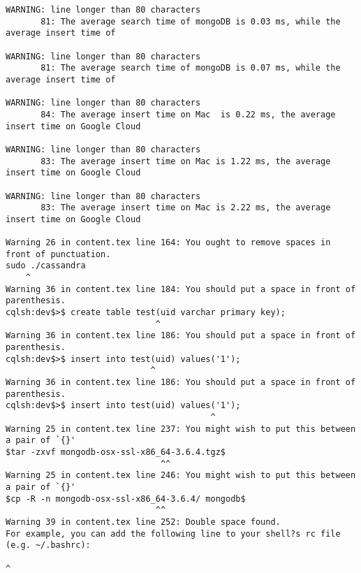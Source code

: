 \begin{tiny}
\begin{verbatim}
WARNING: line longer than 80 characters
       81: The average search time of mongoDB is 0.03 ms, while the average insert time of 

WARNING: line longer than 80 characters
       81: The average search time of mongoDB is 0.07 ms, while the average insert time of 

WARNING: line longer than 80 characters
       84: The average insert time on Mac  is 0.22 ms, the average insert time on Google Cloud

WARNING: line longer than 80 characters
       83: The average insert time on Mac is 1.22 ms, the average insert time on Google Cloud

WARNING: line longer than 80 characters
       83: The average insert time on Mac is 2.22 ms, the average insert time on Google Cloud

Warning 26 in content.tex line 164: You ought to remove spaces in front of punctuation.
sudo ./cassandra  
    ^
Warning 36 in content.tex line 184: You should put a space in front of parenthesis.
cqlsh:dev$>$ create table test(uid varchar primary key);   
                              ^
Warning 36 in content.tex line 186: You should put a space in front of parenthesis.
cqlsh:dev$>$ insert into test(uid) values('1');  
                             ^
Warning 36 in content.tex line 186: You should put a space in front of parenthesis.
cqlsh:dev$>$ insert into test(uid) values('1');  
                                         ^
Warning 25 in content.tex line 237: You might wish to put this between a pair of `{}'
$tar -zxvf mongodb-osx-ssl-x86_64-3.6.4.tgz$  
                               ^^
Warning 25 in content.tex line 246: You might wish to put this between a pair of `{}'
$cp -R -n mongodb-osx-ssl-x86_64-3.6.4/ mongodb$  
                              ^^
Warning 39 in content.tex line 252: Double space found.
For example, you can add the following line to your shell?s rc file (e.g. ~/.bashrc):  
                                                                         ^
\end{verbatim}
\end{tiny}

